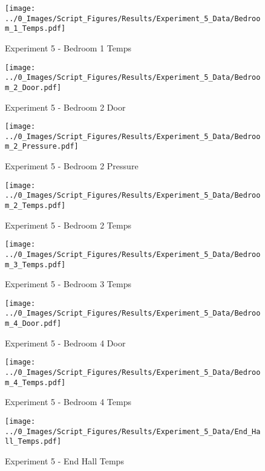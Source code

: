 	\begin{figure}[H]
		\centering
		\texttt{[image: ../0\_Images/Script\_Figures/Results/Experiment\_5\_Data/Bedroom\_1\_Temps.pdf]}
		\caption[]{Experiment 5 - Bedroom 1 Temps}
	\end{figure}
 
	\clearpage

	\begin{figure}[H]
		\centering
		\texttt{[image: ../0\_Images/Script\_Figures/Results/Experiment\_5\_Data/Bedroom\_2\_Door.pdf]}
		\caption[]{Experiment 5 - Bedroom 2 Door}
	\end{figure}
 

	\begin{figure}[H]
		\centering
		\texttt{[image: ../0\_Images/Script\_Figures/Results/Experiment\_5\_Data/Bedroom\_2\_Pressure.pdf]}
		\caption[]{Experiment 5 - Bedroom 2 Pressure}
	\end{figure}
 
	\clearpage

	\begin{figure}[H]
		\centering
		\texttt{[image: ../0\_Images/Script\_Figures/Results/Experiment\_5\_Data/Bedroom\_2\_Temps.pdf]}
		\caption[]{Experiment 5 - Bedroom 2 Temps}
	\end{figure}
 

	\begin{figure}[H]
		\centering
		\texttt{[image: ../0\_Images/Script\_Figures/Results/Experiment\_5\_Data/Bedroom\_3\_Temps.pdf]}
		\caption[]{Experiment 5 - Bedroom 3 Temps}
	\end{figure}
 
	\clearpage

	\begin{figure}[H]
		\centering
		\texttt{[image: ../0\_Images/Script\_Figures/Results/Experiment\_5\_Data/Bedroom\_4\_Door.pdf]}
		\caption[]{Experiment 5 - Bedroom 4 Door}
	\end{figure}
 

	\begin{figure}[H]
		\centering
		\texttt{[image: ../0\_Images/Script\_Figures/Results/Experiment\_5\_Data/Bedroom\_4\_Temps.pdf]}
		\caption[]{Experiment 5 - Bedroom 4 Temps}
	\end{figure}
 
	\clearpage

	\begin{figure}[H]
		\centering
		\texttt{[image: ../0\_Images/Script\_Figures/Results/Experiment\_5\_Data/End\_Hall\_Temps.pdf]}
		\caption[]{Experiment 5 - End Hall Temps}
	\end{figure}
 

